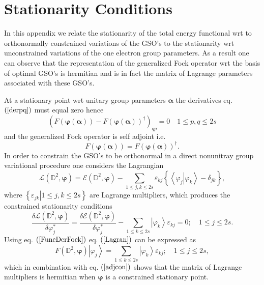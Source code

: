 \documentclass{preprint}
\begin{document}
\section{Stationarity Conditions\label{StatCon}}

In this appendix we relate the stationarity of the total energy functional
wrt to orthonormally constrained variations of the GSO's to the stationarity
wrt unconstrained variations of the one electron group parameters. As a
result one can observe that the representation of the generalized Fock
operator wrt the basis of optimal GSO's is hermitian and is in fact the
matrix of Lagrange parameters associated with these GSO's.

At a stationary point wrt unitary group parameters $\bm{\alpha}$ the
derivatives eq. $\left( \ref{derpq}\right) $ must equal zero hence
\begin{equation}
\left( F\left( \bm{\varphi}\left( \bm{\alpha}\right) \right) -F\left( %
\bm{\varphi}\left( \bm{\alpha}\right) \right) ^{\dagger }\right)
_{qp}=0\quad 1\leq p,q\leq 2s
\end{equation}%
and the generalized Fock operator is self adjoint i.e.
\begin{equation}
F\left( \bm{\varphi}\left( \bm{\alpha}\right) \right) =F\left( \bm{\varphi}%
\left( \bm{\alpha}\right) \right) ^{\dagger }.  \label{adjcon}
\end{equation}%
In order to constrain the GSO's to be orthonormal in a direct nonunitray
group variational procedure one considers the Lagrangian
\begin{equation}
\mathcal{L}\left( \mathbb{D}^{2},\bm{\varphi}\right) =\mathcal{E}\left(
\mathbb{D}^{2},\bm{\varphi}\right) -\sum_{1\leq j,k\leq 2s}\varepsilon
_{kj}\left\{ \left\langle \left. \varphi _{j}\right\vert \varphi
_{k}\right\rangle -\delta _{jk}\right\} ,
\end{equation}%
where $\left\{ \left. \varepsilon _{jk}\right\vert 1\leq j,k\leq 2s\right\} $
are Lagrange multipliers, which produces the constrained stationarity
conditions
\begin{equation}
\frac{\delta \mathcal{L}\left( \mathbb{D}^{2},\bm{\varphi}\right) }{\delta
\varphi _{j}^{\ast }}=\frac{\delta \mathcal{E}\left( \mathbb{D}^{2},%
\bm{\varphi}\right) }{\delta \varphi _{j}^{\ast }}-\sum_{1\leq k\leq
2s}\left\vert \varphi _{k}\right\rangle \varepsilon _{kj}=0;\quad 1\leq
j\leq 2s.  \label{Lagran}
\end{equation}%
Using eq. $\left( \ref{FuncDerFock}\right) $ eq. $\left( \ref{Lagran}\right)
$ can be expressed as
\begin{equation}
F\left( \mathbb{D}^{2},\bm{\varphi}\right) \left\vert \varphi
_{j}\right\rangle =\sum_{1\leq k\leq 2s}\left\vert \varphi _{k}\right\rangle
\varepsilon _{kj};\quad 1\leq j\leq 2s,
\end{equation}%
which in combination with eq. $\left( \ref{adjcon}\right) $ shows that the
matrix of Lagrange multipliers is hermitian when $\bm{\varphi}$ is a
constrained stationary point.
\end{document}
